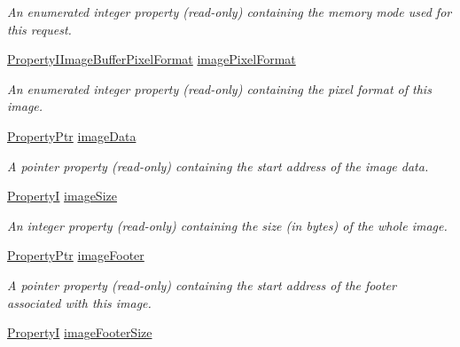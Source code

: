 \begin{DoxyCompactItemize}
\begin{DoxyCompactList}\small\item\em An enumerated integer property {\bfseries }(read-\/only) containing the memory mode used for this request. \end{DoxyCompactList}\item 
\hyperlink{group___common_interface_ga4f53082cdae4edfc1f87e928a0ab4184}{Property\+I\+Image\+Buffer\+Pixel\+Format} \hyperlink{classmv_i_m_p_a_c_t_1_1acquire_1_1_request_a4b904be99f464613adb54c09cf674ad9}{image\+Pixel\+Format}
\begin{DoxyCompactList}\small\item\em An enumerated integer property {\bfseries }(read-\/only) containing the pixel format of this image. \end{DoxyCompactList}\item 
\hyperlink{classmv_i_m_p_a_c_t_1_1acquire_1_1_property_ptr}{Property\+Ptr} \hyperlink{classmv_i_m_p_a_c_t_1_1acquire_1_1_request_ad676c45f908bb41df04b15a85bf1f6fd}{image\+Data}
\begin{DoxyCompactList}\small\item\em A pointer property {\bfseries }(read-\/only) containing the start address of the image data. \end{DoxyCompactList}\item 
\hyperlink{group___common_interface_ga12d5e434238ca242a1ba4c6c3ea45780}{Property\+I} \hyperlink{classmv_i_m_p_a_c_t_1_1acquire_1_1_request_ac568c457aa474e73066bcc369a26cca1}{image\+Size}
\begin{DoxyCompactList}\small\item\em An integer property {\bfseries }(read-\/only) containing the size (in bytes) of the whole image. \end{DoxyCompactList}\item 
\hyperlink{classmv_i_m_p_a_c_t_1_1acquire_1_1_property_ptr}{Property\+Ptr} \hyperlink{classmv_i_m_p_a_c_t_1_1acquire_1_1_request_acb47966e7619eec1fa38befb388a2f39}{image\+Footer}
\begin{DoxyCompactList}\small\item\em A pointer property {\bfseries }(read-\/only) containing the start address of the footer associated with this image. \end{DoxyCompactList}\item 
\hyperlink{group___common_interface_ga12d5e434238ca242a1ba4c6c3ea45780}{Property\+I} \hyperlink{classmv_i_m_p_a_c_t_1_1acquire_1_1_request_a6d8df3daf87f05fefbad25b7591a2459}{image\+Footer\+Size}

\end{DoxyCompactItemize}
